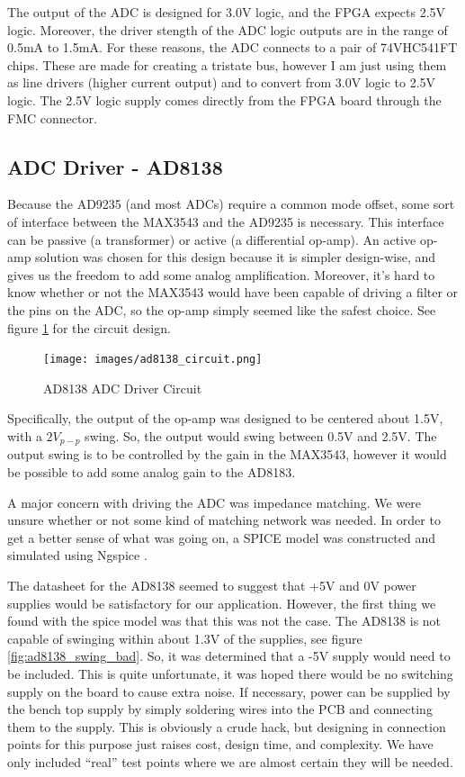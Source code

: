 \documentclass[a4paper, 12pt, notitlepage]{article}
\begin{document}
The output of the ADC is designed for 3.0V logic, and the FPGA expects 2.5V logic.  Moreover, the driver stength of the ADC logic outputs are in the range of 0.5mA to 1.5mA.  For these reasons, the ADC connects to a pair of 74VHC541FT chips.  These are made for creating a tristate bus, however I am just using them as line drivers (higher current output) and to convert from 3.0V logic to 2.5V logic.  The 2.5V logic supply comes directly from the FPGA board through the FMC connector.

\subsection{ADC Driver - AD8138}
Because the AD9235 (and most ADCs) require a common mode offset, some sort of interface between the MAX3543 and the AD9235 is necessary.  This interface can be passive (a transformer) or active (a differential op-amp).  An active op-amp solution was chosen for this design because it is simpler design-wise, and gives us the freedom to add some analog amplification.  Moreover, it's hard to know whether or not the MAX3543 would have been capable of driving a filter or the pins on the ADC, so the op-amp simply seemed like the safest choice.  See figure \ref{fig:ad8138_circuit} for the circuit design.

\begin{figure}[ht]
  \centering
  \caption{AD8138 ADC Driver Circuit}
  \label{fig:ad8138_circuit}
  \texttt{[image: images/ad8138\_circuit.png]}
\end{figure}

Specifically, the output of the op-amp was designed to be centered about 1.5V, with a $2V_{p-p}$ swing.  So, the output would swing between 0.5V and 2.5V.  The output swing is to be controlled by the gain in the MAX3543, however it would be possible to add some analog gain to the AD8183.

A major concern with driving the ADC was impedance matching.  We were unsure whether or not some kind of matching network was needed.  In order to get a better sense of what was going on, a SPICE model was constructed and simulated using Ngspice \cite{ngspice}.

The datasheet for the AD8138 seemed to suggest that +5V and 0V power supplies would be satisfactory for our application.  However, the first thing we found with the spice model was that this was not the case.  The AD8138 is not capable of swinging within about 1.3V of the supplies, see figure \ref{fig:ad8138_swing_bad}.  So, it was determined that a -5V supply would need to be included.  This is quite unfortunate, it was hoped there would be no switching supply on the board to cause extra noise.  If necessary, power can be supplied by the bench top supply by simply soldering wires into the PCB and connecting them to the supply.  This is obviously a crude hack, but designing in connection points for this purpose just raises cost, design time, and complexity.  We have only included ``real'' test points where we are almost certain they will be needed.
\end{document}
